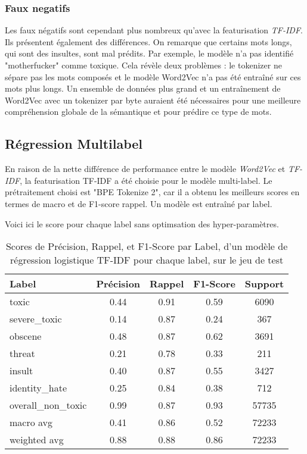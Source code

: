 \subsubsection{Faux negatifs}
Les faux négatifs sont cependant plus nombreux qu'avec la featurisation \textit{TF-IDF}. 
Ils présentent également des différences. 
On remarque que certains mots longs, qui sont des insultes, sont mal prédits. 
Par exemple, le modèle n'a pas identifié "motherfucker" comme toxique. 
Cela révèle deux problèmes : le tokenizer ne sépare pas les mots composés et le modèle Word2Vec n'a pas été entraîné sur ces mots plus longs. 
Un ensemble de données plus grand et un entraînement de Word2Vec avec un tokenizer par byte auraient été nécessaires pour une meilleure compréhension globale de la sémantique et pour prédire ce type de mots.

\subsection{Régression Multilabel}
En raison de la nette différence de performance entre le modèle \textit{Word2Vec} et \textit{TF-IDF}, la featurisation TF-IDF a été choisie pour le modèle multi-label. 
Le prétraitement choisi est "BPE Tokenize 2", car il a obtenu les meilleurs scores en termes de macro et de F1-score rappel. 
Un modèle est entraîné par label.

Voici ici le score pour chaque label sans optimsation des hyper-paramètres.
\begin{table}[ht]
    \centering
    \caption{Scores de Précision, Rappel, et F1-Score par Label, d'un modèle de régression logistique TF-IDF pour chaque label, sur le jeu de test}
    \begin{tabular}{lcccc}
    \hline
    \textbf{Label} & \textbf{Précision} & \textbf{Rappel} & \textbf{F1-Score} & \textbf{Support} \\ \hline
    toxic          & 0.44               & 0.91            & 0.59              & 6090             \\
    severe\_toxic  & 0.14               & 0.87            & 0.24              & 367              \\
    obscene        & 0.48               & 0.87            & 0.62              & 3691             \\
    threat         & 0.21               & 0.78            & 0.33              & 211              \\
    insult         & 0.40               & 0.87            & 0.55              & 3427             \\
    identity\_hate & 0.25               & 0.84            & 0.38              & 712              \\
    overall\_non\_toxic & 0.99           & 0.87            & 0.93              & 57735            \\\hline
    macro avg      & 0.41               & 0.86            & 0.52              & 72233            \\
    weighted avg   & 0.88               & 0.88            & 0.86              & 72233            \\
    \end{tabular}
    \label{tab:scores}
\end{table}
